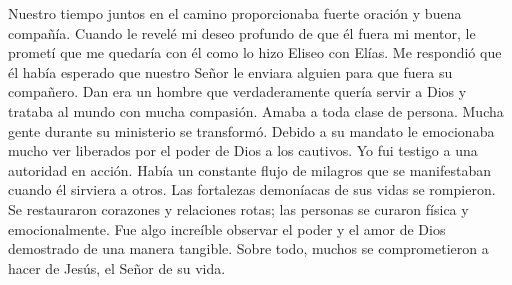 \documentclass[twoside, 12pt]{book}
\begin{document}
Nuestro tiempo juntos en el camino proporcionaba fuerte oración y buena compañía. Cuando le revelé mi deseo profundo de que él fuera mi mentor, le prometí que me quedaría con él como lo hizo Eliseo con Elías. Me respondió que él había esperado que nuestro Señor le enviara alguien para que fuera su compañero. Dan era un hombre que verdaderamente quería servir a Dios y trataba al mundo con mucha compasión. Amaba a toda clase de persona. Mucha gente durante su ministerio se transformó. Debido a su mandato le emocionaba mucho ver liberados por el poder de Dios a los cautivos. Yo fui testigo a una autoridad en acción. Había un constante flujo de milagros que se manifestaban cuando él sirviera a otros.  Las fortalezas demoníacas de sus vidas se rompieron.  Se restauraron corazones y relaciones rotas; las personas se curaron física y emocionalmente. Fue algo increíble observar el poder y el amor de Dios demostrado de una manera tangible.  Sobre todo, muchos se comprometieron a hacer de Jesús, el Señor de su vida.\\
\end{document}
